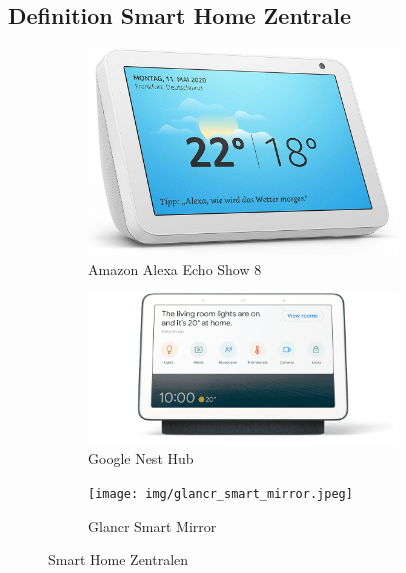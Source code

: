 \subsection{Definition Smart Home Zentrale}\label{vw_definition}
 	\begin{figure}[ht!]
 		\centering
 		\begin{subfigure}[t]{0.3\linewidth}
 			\centering
 			\includegraphics[width=0.9\textwidth]{img/alexa_echo_show8.jpg}
 			\caption[Amazon Alexa Echo Show 8]{Amazon Alexa Echo Show 8}
 			\label{fig:alexa-echo-show8}
 		\end{subfigure}
 		\hfill
 		\begin{subfigure}[t]{0.3\linewidth}
 			\centering
 			\includegraphics[width=0.9\textwidth]{img/google_nest_hub.png}
 			\caption[Google Nest Hub]{Google Nest Hub}
 			\label{fig:google-nest-hub}
 		\end{subfigure}
 		\hfill
 		\begin{subfigure}[t]{0.3\linewidth}
 			\centering
 			\texttt{[image: img/glancr\_smart\_mirror.jpeg]}
 			\caption[Glancr Smart Mirror]{Glancr Smart Mirror}
 			\label{fig:glancr-smart-mirror}
 		\end{subfigure}
 		\caption[Beispiele für Smart Home Zentralen]{Smart Home Zentralen}
 		\label{fig:smart-home-zentralen}
 	\end{figure}
